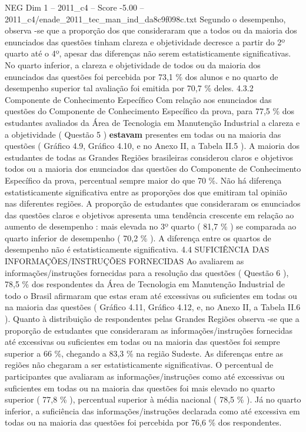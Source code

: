 \begin{textsample}{NEG Dim 1 – 2011\_c4 – Score -5.00 – 2011\_c4/enade\_2011\_tec\_man\_ind\_da8c9f098c.txt}
Segundo o desempenho, observa -se que a proporção dos que consideraram que a todos ou da maioria dos enunciados das questões tinham clareza e objetividade decresce a partir do 2º quarto até o 4º, apesar das diferenças não serem estatisticamente significativas.
No quarto inferior, a clareza e objetividade de todos ou da maioria dos enunciados das questões foi percebida por 73,1 \% dos alunos e no quarto de desempenho superior tal avaliação foi emitida por 70,7 \% deles. 4.3.2 Componente de Conhecimento Específico Com relação aos enunciados das questões do Componente de Conhecimento Específico da prova, para 77,5 \% dos estudantes avaliados da Área de Tecnologia em Manutenção Industrial a clareza e a objetividade ( Questão 5 ) \textbf{estavam} presentes em todas ou na maioria das questões ( Gráfico 4.9, Gráfico 4.10, e no Anexo II, a Tabela II.5 ).
A maioria dos estudantes de todas as Grandes Regiões brasileiras considerou claros e objetivos todos ou a maioria dos enunciados das questões do Componente de Conhecimento Específico da prova, percentual sempre maior do que 70 \%.
Não há diferença estatisticamente significativa entre as proporções dos que emitiram tal opinião nas diferentes regiões.
A proporção de estudantes que consideraram os enunciados das questões claros e objetivos apresenta uma tendência crescente em relação ao aumento de desempenho : mais elevada no 3º quarto ( 81,7 \% ) se comparada ao quarto inferior de desempenho ( 70,2 \% ).
A diferença entre os quartos de desempenho não é estatisticamente significativa. 4.4 SUFICIÊNCIA DAS INFORMAÇÕES/INSTRUÇÕES FORNECIDAS Ao avaliarem as informações/instruções fornecidas para a resolução das questões ( Questão 6 ), 78,5 \% dos respondentes da Área de Tecnologia em Manutenção Industrial de todo o Brasil afirmaram que estas eram até excessivas ou suficientes em todas ou na maioria das questões ( Gráfico 4.11, Gráfico 4.12, e, no Anexo II, a Tabela II.6 ).
Quanto à distribuição de respondentes pelas Grandes Regiões observa -se que a proporção de estudantes que consideraram as informações/instruções fornecidas até excessivas ou suficientes em todas ou na maioria das questões foi sempre superior a 66 \%, chegando a 83,3 \% na região Sudeste.
As diferenças entre as regiões não chegaram a ser estatisticamente significativas.
O percentual de participantes que avaliaram as informações/instruções como até excessivas ou suficientes em todas ou na maioria das questões foi mais elevado no quarto superior ( 77,8 \% ), percentual superior à média nacional ( 78,5 \% ).
Já no quarto inferior, a suficiência das informações/instruções declarada como até excessiva em todas ou na maioria das questões foi percebida por 76,6 \% dos respondentes.

\end{textsample}
